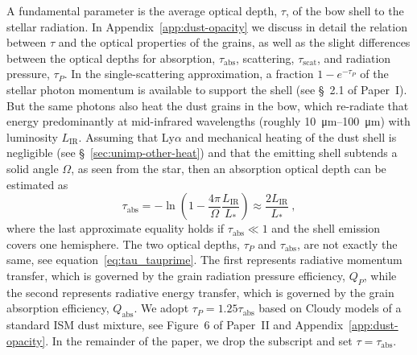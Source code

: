 \documentclass[useAMS, usenatbib, a4paper]{mnras}
\newcommand\IR{\ensuremath{_{\text{IR}}}}
\begin{document}
A fundamental parameter is the average optical depth, \(\tau\), of the
bow shell to the stellar radiation. In Appendix~\ref{app:dust-opacity}
we discuss in detail the relation between \(\tau\) and the optical
properties of the grains, as well as the slight differences between
the optical depths for absorption, \(\tau_{\text{abs}}\), scattering,
\(\tau_{\text{scat}}\), and radiation pressure, \(\tau_P\).  In the
single-scattering approximation, a fraction \(1 - e^{-\tau_P}\) of the
stellar photon momentum is available to support the shell (see \S~2.1
of Paper~I).  But the same photons also heat the dust grains in the
bow, which re-radiate that energy predominantly at mid-infrared
wavelengths (roughly \SIrange{10}{100}{\um}) with luminosity \(L\IR\).
Assuming that Ly\(\alpha\) and mechanical heating of the dust shell is
negligible (see \S~\ref{sec:unimp-other-heat}) and that the emitting
shell subtends a solid angle \(\Omega\), as seen from the star, then an
absorption optical depth can be estimated as
\begin{equation}
  \label{eq:tau-empirical}
  \tau_{\text{abs}} = -\ln \left( 1 - \frac{4\pi}{\Omega} \frac{L\IR}{L_*} \right)
  \approx \frac{2 L\IR}{L_*} \ ,
\end{equation}
where the last approximate equality holds if
\(\tau_{\text{abs}} \ll 1\) and the shell emission covers one hemisphere.
The two optical depths, \(\tau_P\) and \(\tau_{\text{abs}}\), are not
exactly the same, see equation~\eqref{eq:tau_tauprime}.  The first
represents radiative momentum transfer, which is governed by the grain
radiation pressure efficiency, \(Q_P\), while the second represents
radiative energy transfer, which is governed by the grain absorption
efficiency, \(Q_{\text{abs}}\).  We adopt
\(\tau_P = 1.25 \tau_{\text{abs}}\) based on Cloudy models of a standard ISM
dust mixture, see Figure~6 of Paper~II and
Appendix~\ref{app:dust-opacity}.  In the remainder of the paper, we
drop the subscript and set \(\tau = \tau_{\text{abs}}\).
\end{document}
